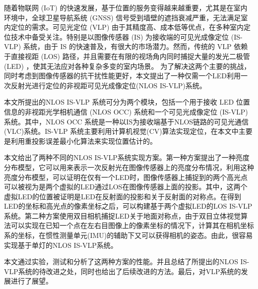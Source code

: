 
\begin{abstractCN}

随着物联网 (IoT) 的快速发展，基于位置的服务变得越来越重要，尤其是在室内环境中，全球卫星导航系统 (GNSS) 信号受到墙壁的遮挡衰减严重，无法满足室内定位的需求。可见光定位 (VLP) 由于其精度高、成本低等优点，在多种室内定位技术中备受关注。特别是以图像传感器 (IS) 为接收端的可见光成像定位 (IS-VLP) 系统，由于 IS 的快速普及，有很大的市场潜力。然而，传统的 VLP 依赖于直接视距 (LOS) 路径，并且需要在有限的视场角内同时捕捉大量的发光二极管(LED) ，使其无法应对各种复杂多变的室内场景。 为了解决这两个主要的挑战，同时考虑到图像传感器的抗干扰性能更好，本文提出了一种仅需一个LED利用一次反射光进行定位的非视距可见光成像定位(NLOS IS-VLP)系统。

本文所提出的NLOS IS-VLP 系统可分为两个模块，包括一个用于接收 LED 位置信息的非视距光学相机通信 (NLOS OCC) 系统和一个可见光成像定位 (IS-VLP) 系统。其中，NLOS OCC 系统是一种以IS为接收端基于NLOS链路的可见光通信(VLC)系统。IS-VLP 系统主要利用计算机视觉(CV)算法实现定位，在本文中主要是利用重投影误差最小化算法来实现位置估计的。


本文给出了两种不同的NLOS IS-VLP系统实现方案。第一种方案提出了一种亮度分布模型，它可以用来表示一次反射光在图像传感器上的亮度分布情况，利用这种亮度分布模型，可以证明在仅有一个LED时，图像传感器上捕捉到的两个高光点可以被视为是两个虚拟的LED通过LOS在图像传感器上面的投影。其中，这两个虚拟LED的位置被证明是LED在反射面的投影和关于反射面的对称点。在得到LED的坐标和高光点的像素坐标之后，可以构建基于两个虚拟LED的LOS IS-VLP系统。第二种方案使用双目相机捕捉LED关于地面对称点，由于双目立体视觉算法可以实现在已知一个点在左右目图像上的像素坐标的情况下，计算其在相机坐标系的坐标，在惯性测量单元(IMU)的辅助下又可以获得相机的姿态。由此，很容易实现基于单灯的NLOS IS-VLP系统。

本文通过实验，测试和分析了这两种方案的性能。并且总结了所提出的NLOS IS-VLP系统的待改进之处，同时也给出了后续改进的方法。最后，对VLP系统的发展进行了展望。
 
\end{abstractCN}
	



